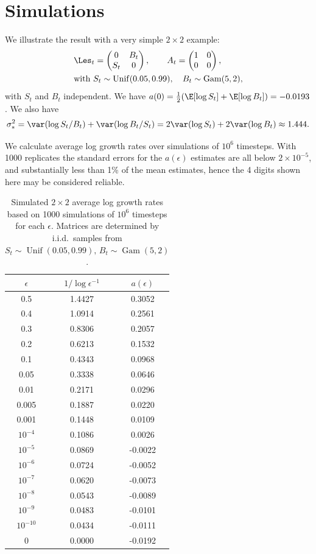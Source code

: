\documentclass[11pt]{amsart}
\begin{document}
\section{Simulations}  \label{sec:simulation}
We illustrate the result with a very simple $2\times 2$ example:
\begin{align*}
&\Les_{t}=
\begin{pmatrix}
 0& B_{t}\\
 S_{t}&0
\end{pmatrix}, \qquad
A_{t}=
\begin{pmatrix}
1&0\\0&0
\end{pmatrix}, \\
&\text{with }
S_{t}\sim \operatorname{Unif}(0.05,0.99),\quad B_{t} \sim \operatorname{Gam}(5,2),
\end{align*}
with $S_{t}$ and $B_{t}$ independent. We have $a(0)=\frac12(\E[\log S_{t}]+\E[\log B_{t}])=-0.0193$. We also have
$$
	\sigma_*^2 = \var(\log S_t/B_t) + \var(\log B_t/S_t)=2\var(\log S_t)+2\var(\log B_t) \approx 1.444.
$$ 

We calculate average log growth rates over simulations of $10^6$ timesteps.
With 1000 replicates the standard errors for the $a(\epsilon)$ estimates are all below $2\times 10^{-5}$, and substantially less than 1\% of the mean estimates, hence the 4 digits shown here may be considered reliable.


\begin{table}[ht]
\centering
\begin{tabular}{ccc}
  \toprule
 $\epsilon$&$1/\log\epsilon^{-1}$&$a(\epsilon)$\\
  \midrule
0.5 & 1.4427 & 0.3052 \\ 
0.4 & 1.0914 & 0.2561 \\ 
0.3 & 0.8306 & 0.2057 \\ 
0.2 & 0.6213 & 0.1532 \\ 
0.1 & 0.4343 & 0.0968 \\ 
0.05 & 0.3338 & 0.0646 \\ 
0.01 & 0.2171 & 0.0296 \\ 
0.005 & 0.1887 & 0.0220 \\ 
0.001 & 0.1448 & 0.0109 \\ 
$10^{-4}$ & 0.1086 & 0.0026 \\ 
$10^{-5}$ & 0.0869 & -0.0022 \\ 
$10^{-6}$ & 0.0724 & -0.0052 \\ 
$10^{-7}$ & 0.0620 & -0.0073 \\ 
$10^{-8}$ & 0.0543 & -0.0089 \\ 
$10^{-9}$ & 0.0483 & -0.0101 \\ 
$10^{-10}$ & 0.0434 & -0.0111 \\ 
0 & 0.0000 & -0.0192 \\ 
   \bottomrule
\end{tabular}
\caption{Simulated $2\times 2$ average log growth rates based on 1000 simulations of $10^6$ timesteps for each $\epsilon$.
Matrices are determined by i.i.d.\ samples from $S_{t}\sim \operatorname{Unif}(0.05,0.99),\, B_{t} \sim \operatorname{Gam}(5,2)$.} 
\label{T:diapausesim}
\end{table}
\end{document}
